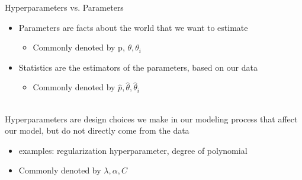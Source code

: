 \documentclass[aspectratio=169]{../latex_main/tntbeamer}  %
\begin{document}
	
	\begin{frame}{Hyperparameters vs. Parameters}
        \begin{itemize}
            \item Parameters are facts about the world that we want to estimate
            \begin{itemize}
                \item Commonly denoted by p, $\theta, \theta_i$
            \end{itemize}
            \item Statistics are the estimators of the parameters, based on our data
            \begin{itemize}
                \item Commonly denoted by $\hat{p}, \hat{\theta}, \hat{\theta}_i$
            \end{itemize}
        \end{itemize}\\
        \bigskip
        Hyperparameters are design choices we make in our modeling process that affect our model, but do not directly come from the data

        \begin{itemize}
            \item examples: regularization hyperparameter, degree of polynomial
            \item Commonly denoted by $\lambda, \alpha, C$
        \end{itemize}
	\end{frame}
\end{document}
